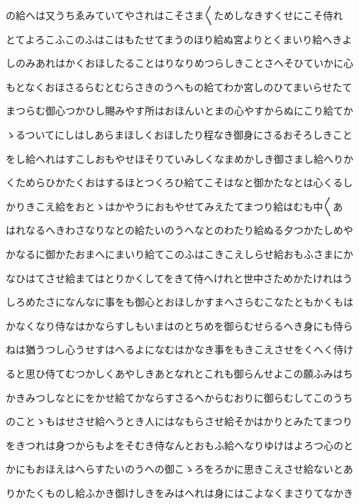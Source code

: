\documentclass[a4paper,11pt,landscape]{ltjtarticle}
\begin{document}
の給へは又うちゑみていてやされはこそさま〱ためしなきすくせにこそ侍れ
\par\medskip
とてよろこふこのふはこはもたせてまうのほり給ぬ宮よりとくまいり給へきよ
\par\medskip
しのみあれはかくおほしたることはりなりめつらしきことさへそひていかに心
\par\medskip
もとなくおほさるらむとむらさきのうへもの給てわか宮しのひてまいらせたて
\par\medskip
まつらむ御心つかひし賜みやす所はおほんいとまの心やすからぬにこり給てか
\par\medskip
ゝるついてにしはしあらまほしくおほしたり程なき御身にさるおそろしきこと
\par\medskip
をし給へれはすこしおもやせほそりていみしくなまめかしき御さまし給へりか
\par\medskip
くためらひかたくおはするほとつくろひ給てこそはなと御かたなとは心くるし
\par\medskip
かりきこえ給をおとゝはかやうにおもやせてみえたてまつり給はむも中〱あ
\par\medskip
はれなるへきわさなりなとの給たいのうへなとのわたり給ぬる夕つかたしめや
\par\medskip
かなるに御かたおまへにまいり給てこのふはこきこえしらせ給おもふさまにか
\par\medskip
なひはてさせ給まてはとりかくしてをきて侍へけれと世中さためかたけれはう
\par\medskip
しろめたさになんなに事をも御心とおほしかすまへさらむこなたともかくもは
\par\medskip
かなくなり侍なはかならすしもいまはのとちめを御らむせらるへき身にも侍ら
\par\medskip
ねは猶うつし心うせすはへるよになむはかなき事をもきこえさせをくへく侍け
\par\medskip
ると思ひ侍てむつかしくあやしきあとなれとこれも御らんせよこの願ふみはち
\par\medskip
かきみつしなとにをかせ給てかならすさるへからむおりに御らむしてこのうち
\par\medskip
のことゝもはせさせ給へうとき人にはなもらさせ給そかはかりとみたてまつり
\par\medskip
をきつれは身つからもよをそむき侍なんとおもふ給へなりゆけはよろつ心のと
\par\medskip
かにもおほえはへらすたいのうへの御こゝろをろかに思きこえさせ給ないとあ
\par\medskip
りかたくものし給ふかき御けしきをみはへれは身にはこよなくまさりてなかき
\par\medskip
\end{document}
